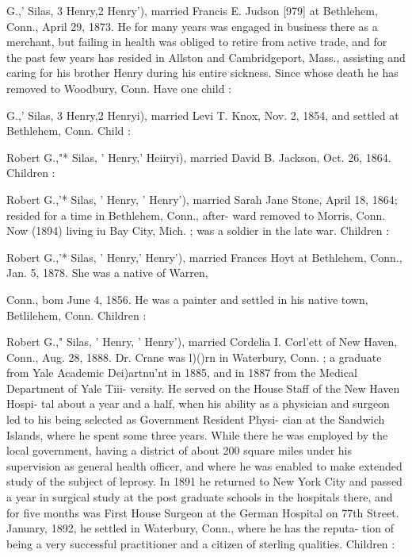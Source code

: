 \documentclass{book}
\begin{document}
G.,' Silas, 3 Henry,2 Henry'), married Francis E. Judson [979] 
at Bethlehem, Conn., April 29, 1873. He for many years was 
engaged in business there as a merchant, but failing in health was 
obliged to retire from active trade, and for the past few years 
has resided in Allston and Cambridgeport, Mass., assisting and 
caring for his brother Henry during his entire sickness. Since 
whose death he has removed to Woodbury, Conn. Have one 
child : 


G.,' Silas, 3 Henry,2 Henryi), married Levi T. Knox, Nov. 2, 
1854, and settled at Bethlehem, Conn. Child : 


Robert G.,"* Silas, ' Henry,' Heiiryi), married David B. Jackson, 
Oct. 26, 1864. Children : 




Robert G.,'* Silas, ' Henry, ' Henry'), married Sarah Jane Stone, 
April 18, 1864; resided for a time in Bethlehem, Conn., after- 
ward removed to Morris, Conn. Now (1894) living iu Bay City, 
Mich. ; was a soldier in the late war. Children : 


Robert G.,'* Silas, ' Henry,' Henry'), married Frances Hoyt at 
Bethlehem, Conn., Jan. 5, 1878. She was a native of Warren, 




Conn., bom June 4, 1856. He was a painter and settled in his 
native town, Betlilehem, Conn. Children : 






Robert G.," Silas, ' Henry, ' Henry'), married Cordelia I. Corl'ett 
of New Haven, Conn., Aug. 28, 1888. Dr. Crane was l)()rn in 
Waterbury, Conn. ; a graduate from Yale Academic Dei)artnu'nt 
in 1885, and in 1887 from the Medical Department of Yale Tiii- 
versity. He served on the House Staff of the New Haven Hospi- 
tal about a year and a half, when his ability as a physician and 
surgeon led to his being selected as Government Resident Physi- 
cian at the Sandwich Islands, where he spent some three years. 
While there he was employed by the local government, having a 
district of about 200 square miles under his supervision as general 
health officer, and where he was enabled to make extended study 
of the subject of leprosy. In 1891 he returned to New York 
City and passed a year in surgical study at the post graduate 
schools in the hospitals there, and for five months was First 
House Surgeon at the German Hospital on 77th Street. January, 
1892, he settled in Waterbury, Conn., where he has the reputa- 
tion of being a very successful practitioner and a citizen of 
sterling qualities. Children : 
\end{document}
